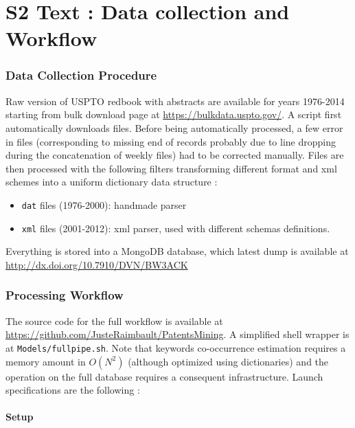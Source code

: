 


\section*{S2 Text : Data collection and Workflow}

\label{supp:data}

\subsubsection*{Data Collection Procedure}

Raw version of USPTO redbook with abstracts are available for years 1976-2014 starting from bulk download page at \url{https://bulkdata.uspto.gov/}. A script first automatically downloads files. Before being automatically processed, a few error in files (corresponding to missing end of records probably due to line dropping during the concatenation of weekly files) had to be corrected manually. Files are then processed with the following filters transforming different format and xml schemes into a uniform dictionary data structure :

\begin{itemize}
\item \texttt{dat} files (1976-2000): handmade parser
\item \texttt{xml} files (2001-2012): xml parser, used with different schemas definitions.
\end{itemize}

Everything is stored into a MongoDB database, which latest dump is available at \url{http://dx.doi.org/10.7910/DVN/BW3ACK}

\subsubsection*{Processing Workflow}

The source code for the full workflow is available at \url{https://github.com/JusteRaimbault/PatentsMining}. A simplified shell wrapper is at \texttt{Models/fullpipe.sh}. Note that keywords co-occurrence estimation requires a memory amount in $O(N^2)$ (although optimized using dictionaries) and the operation on the full database requires a consequent infrastructure. Launch specifications are the following :

\paragraph{Setup} 

